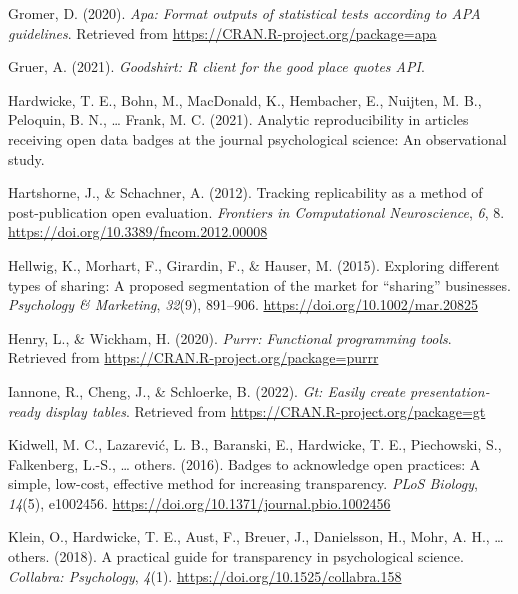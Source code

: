\documentclass[
  english,
  man,floatsintext]{apa6}
\newlength{\cslhangindent}
\newlength{\cslentryspacingunit} %
\newenvironment{CSLReferences}[2] %
 {%
  \setlength{\parindent}{0pt}
  \ifodd #1
  \let\oldpar\par
  \def\par{\hangindent=\cslhangindent\oldpar}
  \fi
  \setlength{\parskip}{#2\cslentryspacingunit}
 }%
 {}
\begin{document}
\begin{CSLReferences}{1}{0}
\leavevmode{}%
Gromer, D. (2020). \emph{Apa: Format outputs of statistical tests according to APA guidelines}. Retrieved from \url{https://CRAN.R-project.org/package=apa}

\leavevmode{}%
Gruer, A. (2021). \emph{Goodshirt: R client for the good place quotes API}.

\leavevmode{}%
Hardwicke, T. E., Bohn, M., MacDonald, K., Hembacher, E., Nuijten, M. B., Peloquin, B. N., \ldots{} Frank, M. C. (2021). Analytic reproducibility in articles receiving open data badges at the journal psychological science: An observational study.

\leavevmode{}%
Hartshorne, J., \& Schachner, A. (2012). Tracking replicability as a method of post-publication open evaluation. \emph{Frontiers in Computational Neuroscience}, \emph{6}, 8. \url{https://doi.org/10.3389/fncom.2012.00008}

\leavevmode{}%
Hellwig, K., Morhart, F., Girardin, F., \& Hauser, M. (2015). Exploring different types of sharing: A proposed segmentation of the market for {``sharing''} businesses. \emph{Psychology \& Marketing}, \emph{32}(9), 891--906. \url{https://doi.org/10.1002/mar.20825}

\leavevmode{}%
Henry, L., \& Wickham, H. (2020). \emph{Purrr: Functional programming tools}. Retrieved from \url{https://CRAN.R-project.org/package=purrr}

\leavevmode{}%
Iannone, R., Cheng, J., \& Schloerke, B. (2022). \emph{Gt: Easily create presentation-ready display tables}. Retrieved from \url{https://CRAN.R-project.org/package=gt}

\leavevmode{}%
Kidwell, M. C., Lazarević, L. B., Baranski, E., Hardwicke, T. E., Piechowski, S., Falkenberg, L.-S., \ldots{} others. (2016). Badges to acknowledge open practices: A simple, low-cost, effective method for increasing transparency. \emph{PLoS Biology}, \emph{14}(5), e1002456. \url{https://doi.org/10.1371/journal.pbio.1002456}

\leavevmode{}%
Klein, O., Hardwicke, T. E., Aust, F., Breuer, J., Danielsson, H., Mohr, A. H., \ldots{} others. (2018). A practical guide for transparency in psychological science. \emph{Collabra: Psychology}, \emph{4}(1). \url{https://doi.org/10.1525/collabra.158}


\end{CSLReferences}
\end{document}
